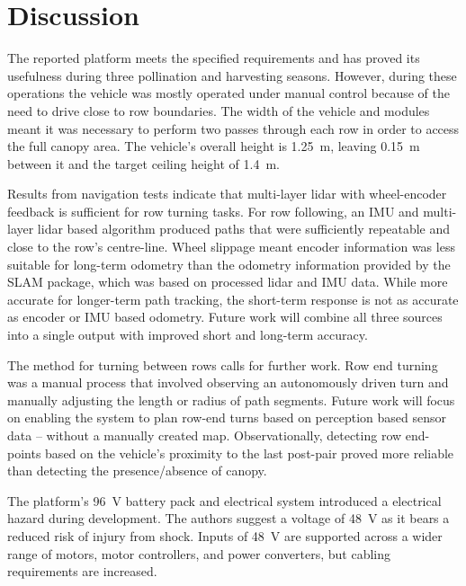 \documentclass[preprint,authoryear,12pt]{elsarticle}
\begin{document}
\section{Discussion}
\label{sect:discussion}

    The reported platform meets the specified requirements and has proved its usefulness during three pollination and harvesting seasons.
    However, during these operations the vehicle was mostly operated under manual control because of the need to drive close to row boundaries.
    The width of the vehicle and modules meant it was necessary to perform two passes through each row in order to access the full canopy area.
    The vehicle's overall height is \SI{1.25}{\meter}, leaving \SI{0.15}{\meter} between it and the target ceiling height of \SI{1.4}{\meter}.

    Results from navigation tests indicate that multi-layer lidar with wheel-encoder feedback is sufficient for row turning tasks.
    For row following, an IMU and multi-layer lidar based algorithm produced paths that were sufficiently repeatable and close to the row's centre-line.
    Wheel slippage meant encoder information was less suitable for long-term odometry than the odometry information provided by the SLAM package, which was based on processed lidar and IMU data.
    While more accurate for longer-term path tracking, the short-term response is not as accurate as encoder or IMU based odometry.
    Future work will combine all three sources into a single output with improved short and long-term accuracy.

    The method for turning between rows calls for further work.
    Row end turning was a manual process that involved observing an autonomously driven turn and manually adjusting the length or radius of path segments.
    Future work will focus on enabling the system to plan row-end turns based on perception based sensor data -- without a manually created map.
    Observationally, detecting row end-points based on the vehicle's proximity to the last post-pair proved more reliable than detecting the presence/absence of canopy.

    The platform's \SI{96}{\volt} battery pack and electrical system introduced a electrical hazard during development.
    The authors suggest a voltage of \SI{48}{\volt} as it bears a reduced risk of injury from shock.
    Inputs of \SI{48}{\volt} are supported across a wider range of motors, motor controllers, and power converters, but cabling requirements are increased.
\end{document}
